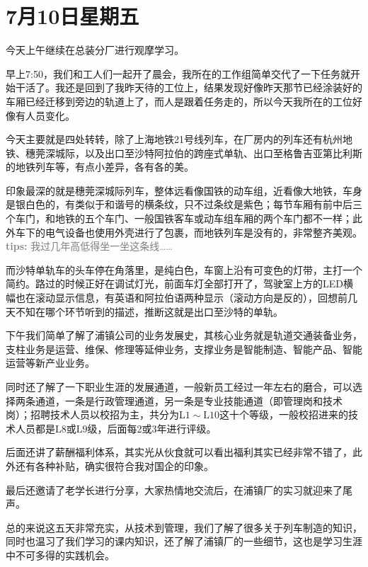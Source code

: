 \documentclass[12pt, oneside, a4paper]{ctexart}
\begin{document}
\section*{7月10日\quad{}星期五}
\diaryJournalBodyFont\vspace{-3mm}\par{}
今天上午继续在总装分厂进行观摩学习。\par{}
早上7:50，我们和工人们一起开了晨会，我所在的工作组简单交代了一下任务就开始干活了。我还是回到了我昨天待的工位上，结果发现好像昨天那节已经涂装好的车厢已经迁移到旁边的轨道上了，而人是跟着任务走的，所以今天我所在的工位好像有人员变化。\par{}
今天主要就是四处转转，除了上海地铁21号线列车，在厂房内的列车还有杭州地铁、穗莞深城际，以及出口至沙特阿拉伯的跨座式单轨、出口至格鲁吉亚第比利斯的地铁列车等，有点小差异，各有各的美。\par{}
印象最深的就是穗莞深城际列车，整体远看像国铁的动车组，近看像大地铁，车身是银白色的，有类似于和谐号的横条纹，只不过条纹是紫色；每节车厢有前中后三个车门，和地铁的五个车门、一般国铁客车或动车组车厢的两个车门都不一样；此外车下的电气设备也使用外壳进行了包裹，而地铁列车是没有的，非常整齐美观。\textcolor{gray}{{\bf{}tips: }我过几年高低得坐一坐这条线……}\par{}
而沙特单轨车的头车停在角落里，是纯白色，车窗上沿有可变色的灯带，主打一个简约。路过的时候正好在调试灯光，前面车灯全部打开了，驾驶室上方的LED横幅也在滚动显示信息，有英语和阿拉伯语两种显示（滚动方向是反的），回想前几天不知在哪个环节听到的描述，推断这就是出口至沙特的单轨。\par{}
下午我们简单了解了浦镇公司的业务发展史，其核心业务就是轨道交通装备业务，支柱业务是运营、维保、修理等延伸业务，支撑业务是智能制造、智能产品、智能运营等新产业业务。\par{}
同时还了解了一下职业生涯的发展通道，一般新员工经过一年左右的磨合，可以选择两条通道，一条是行政管理通道，另一条是专业技能通道（即管理岗和技术岗）；招聘技术人员以校招为主，共分为$\mathrm{L1}\sim\mathrm{L10}$这十个等级，一般校招进来的技术人员都是$\mathrm{L8}$或$\mathrm{L9}$级，后面每2或3年进行评级。\par{}
后面还讲了薪酬福利体系，其实光从伙食就可以看出福利其实已经非常不错了，此外还有各种补贴，确实很符合我对国企的印象。\par{}
最后还邀请了老学长进行分享，大家热情地交流后，在浦镇厂的实习就迎来了尾声。\par{}
总的来说这五天非常充实，从技术到管理，我们了解了很多关于列车制造的知识，同时也温习了我们学习的课内知识，还了解了浦镇厂的一些细节，这也是学习生涯中不可多得的实践机会。\par{}
\end{document}
